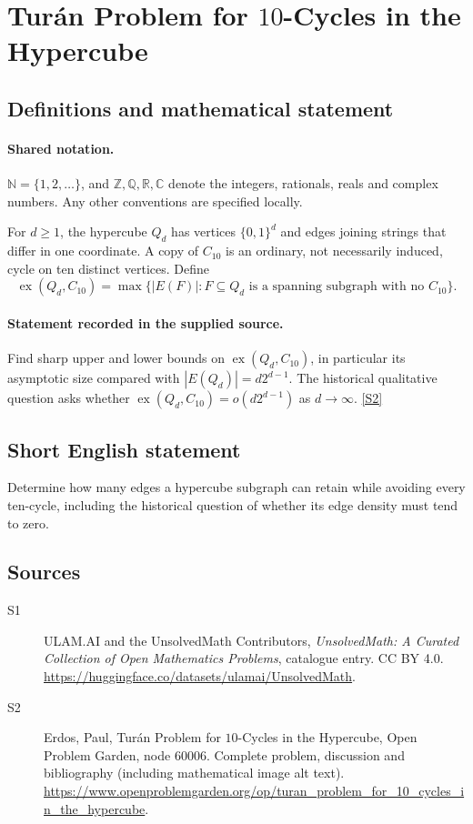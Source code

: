\documentclass[11pt]{book}
\newcommand{\sref}[2]{\hyperlink{source:#1:#2}{[S#2]}}
\begin{document}
\section{Turán Problem for $10$-Cycles in the Hypercube}\label{statement}

\subsection{Definitions and mathematical statement}

\paragraph{Shared notation.}$\mathbb N=\{1,2,\ldots\}$, and $\mathbb Z,\mathbb Q,\mathbb R,\mathbb C$ denote the integers, rationals, reals and complex numbers. Any other conventions are specified locally.


For $d\geq1$, the hypercube $Q_d$ has vertices $\{0,1\}^d$ and edges joining strings that differ in one coordinate. A copy of $C_{10}$ is an ordinary, not necessarily induced, cycle on ten distinct vertices. Define
\[\operatorname{ex}(Q_d,C_{10})=\max\{|E(F)|:F\subseteq Q_d\text{ is a spanning subgraph with no }C_{10}\}.\]
\paragraph{Statement recorded in the supplied source.}
Find sharp upper and lower bounds on $\operatorname{ex}(Q_d,C_{10})$, in particular its asymptotic size compared with $|E(Q_d)|=d2^{d-1}$. The historical qualitative question asks whether $\operatorname{ex}(Q_d,C_{10})=o(d2^{d-1})$ as $d\to\infty$. \sref{statement}{2}
\subsection{Short English statement}
Determine how many edges a hypercube subgraph can retain while avoiding every ten-cycle, including the historical question of whether its edge density must tend to zero.
\subsection{Sources}
\begin{description}
\item[\hypertarget{source:statement:1}{S1}] ULAM.AI and the UnsolvedMath Contributors, \emph{UnsolvedMath: A Curated Collection of Open Mathematics Problems}, catalogue entry. CC BY 4.0. \url{https://huggingface.co/datasets/ulamai/UnsolvedMath}.
\item[\hypertarget{source:statement:2}{S2}] Erdos, Paul, Turán Problem for $10$-Cycles in the Hypercube, Open Problem Garden, node 60006. Complete problem, discussion and bibliography (including mathematical image alt text). \url{https://www.openproblemgarden.org/op/turan_problem_for_10_cycles_in_the_hypercube}.
\end{description}
\label{end:statement}
\end{document}
